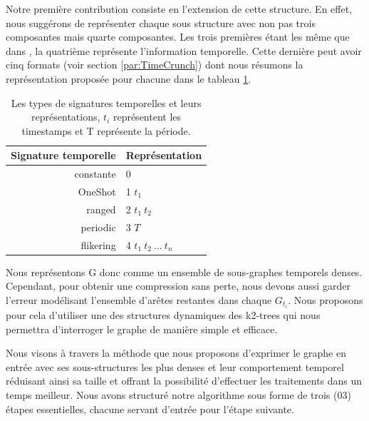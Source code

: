 			Notre première contribution consiste en l'extension de cette structure. En effet, nous suggérons de représenter chaque sous structure avec non pas trois composantes mais quarte composantes. Les trois premières étant les même que dans \citep{hernandez2014compressed}, la quatrième représente l'information temporelle. Cette dernière peut avoir cinq formats (voir section \ref{par:TimeCrunch}) dont nous résumons la représentation proposée pour chacune dans le tableau \ref{tab:signtmp}.
			
			\begin{table}[h]
			\label{tab:signtmp}
			\begin{center}
			\begin{tabular}{|r|l|}
			\hline Signature temporelle & Représentation	
			\\\hline constante & 0	
			
			\\\hline OneShot & 1 $t_{1}$	
			
			\\\hline ranged & 2	$t_{1}\ t_{2}$	
			
			\\\hline periodic & 3  $T$	
			
			\\\hline flikering & 4 $t_{1}\ t_{2}\ ...\ t_{n}$	
			
			\\\hline			
			\end{tabular}
			\end{center}
			
			 \caption{\small {Les types de signatures temporelles et leurs représentations, $t_{i}$	 représentent les timestamps et T représente la période.}}
			\end{table}
			
			Nous représentons G donc comme un ensemble de sous-graphes temporels denses. Cependant, pour obtenir une compression sans perte, nous devons aussi garder l'erreur modélisant l'ensemble d'arêtes restantes dans chaque $G_{t_{i}}$. Nous proposons pour cela d'utiliser une des structures dynamiques des k2-trees qui nous permettra d'interroger le graphe de manière simple et efficace.
			
			 Nous visons à travers la méthode que nous proposons d'exprimer le graphe en entrée avec ses sous-structures les plus denses et leur comportement temporel réduisant ainsi sa taille et offrant la possibilité d'effectuer les traitements dans un temps meilleur. Nous avons structuré notre algorithme sous forme de trois (03) étapes essentielles, chacune servant d'entrée pour l'étape suivante.
			 
